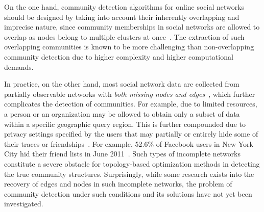 \documentclass[format=acmsmall, review=false, screen=true]{acmart}
\begin{document}
On the one hand, community detection algorithms for online social networks should be designed by taking into account their inherently overlapping and imprecise nature, since community memberships in social networks are allowed to overlap as nodes belong to multiple clusters at once~\cite{xie2013overlapping}. The extraction of such overlapping communities is known to be more challenging than non-overlapping community detection due to higher complexity and higher computational demands.

In practice, on the other hand, most social network data are collected from partially observable networks with {\em both missing nodes and edges}~\cite{kossinets2006effects}, which further complicates the detection of communities. For example, due to limited resources, a person or an organization may be allowed to obtain only a subset of data within a specific geographic query region. This is further compounded due to privacy settings specified by the users that may partially or entirely hide some of their traces or friendships~\cite{acquisti2015privacy}. For example, 52.6\% of Facebook users in New York City hid their friend lists in June 2011~\cite{dey2012facebook}. Such types of incomplete networks constitute a severe obstacle for topology-based optimization methods in detecting the true community structures. Surprisingly, while some research exists into the recovery of edges and nodes in such incomplete networks, the problem of community detection under such conditions and its solutions have not yet been investigated.
\end{document}

